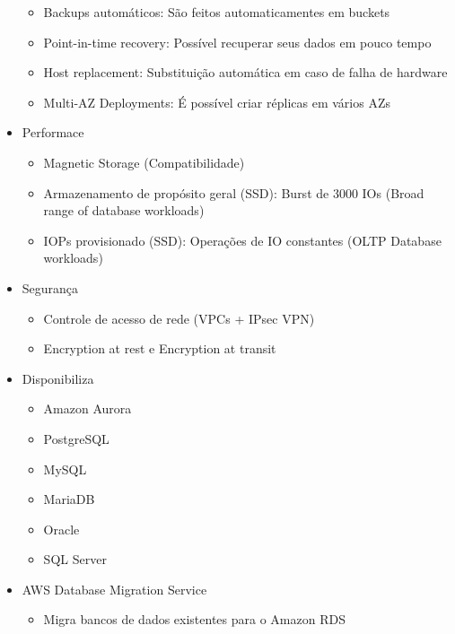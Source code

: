 \begin{frame}[allowframebreaks]
\begin{itemize}
\begin{itemize}
				\item Backups automáticos: São feitos automaticamentes em buckets
				\item Point-in-time recovery: Possível recuperar seus dados em pouco tempo
				\item Host replacement: Substituição automática em caso de falha de hardware
				\item Multi-AZ Deployments: É possível criar réplicas em vários AZs
			\end{itemize}
		\framebreak
		\item Performace
			\begin{itemize}
				\item Magnetic Storage (Compatibilidade)
				\item Armazenamento de propósito geral (SSD): Burst de 3000 IOs (Broad range of database workloads)
				\item IOPs provisionado (SSD): Operações de IO constantes (OLTP Database workloads)
			\end{itemize}
		\item Segurança
			\begin{itemize}
				\item Controle de acesso de rede (VPCs + IPsec VPN)
				\item Encryption at rest e Encryption at transit
			\end{itemize}
	\end{itemize}
	\framebreak
	\begin{itemize}
		\item Disponibiliza
			\begin{multicols}{2}
			\begin{itemize}
				\item Amazon Aurora
				\item PostgreSQL
				\item MySQL
				\columnbreak
				\item MariaDB
				\item Oracle
				\item SQL Server
			\end{itemize}
			\end{multicols}
		\item AWS Database Migration Service
			\begin{itemize}
				\item Migra bancos de dados existentes para o Amazon RDS
			\end{itemize}
	\end{itemize}
\end{frame}
